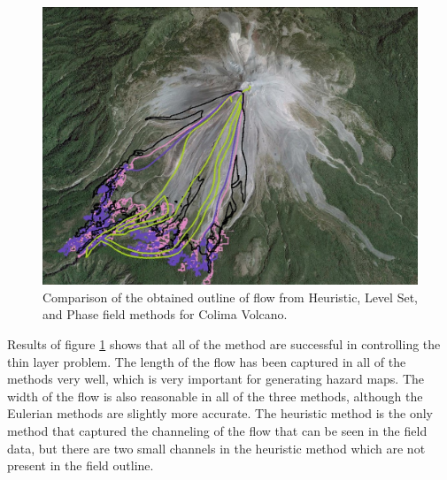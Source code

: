 \documentclass[letterpaper,10pt]{article}
\begin{document}
\begin{figure}[H]
\begin{minipage}[b]{.5 \linewidth}
                \includegraphics[width=.95\textwidth]{IMAGES/comparison1.jpg}
        \end{minipage}
        \caption{Comparison of the obtained outline of flow from Heuristic, Level Set, and Phase field methods for Colima Volcano.}
        \label{Colimapic}
\end{figure}

Results of figure \ref{Colimapic} shows that all of the method are successful in controlling the thin layer problem. 
The length of the flow has been captured in all of the methods very well, which is very important for generating hazard maps. 
The width of the flow is also reasonable in all of the three methods, although the Eulerian methods are slightly more accurate.
The heuristic method is the only method that captured the channeling of the flow that can be seen in the field data, 
but there are two small channels in the heuristic method which are not present in the field outline.
\end{document}
